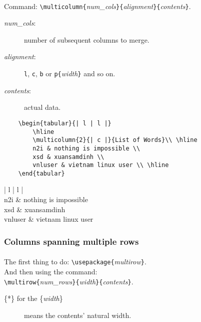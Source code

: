 \paragraph{}
Command: \verb|\multicolumn{|\emph{num\_cols}\verb|}{|\emph{alignment}\verb|}{|\emph{contents}\verb|}|.
\begin{description}
	\item[\emph{num\_cols}:] number of subsequent columns to merge.
	\item[\emph{alignment}:] \texttt{l}, \texttt{c}, \texttt{b} or \verb|p{|\emph{width}\verb|}| and so on.
	\item[\emph{contents}:] actual data.
\end{description}

\begin{verbatim}
	\begin{tabular}{| l | l |}
		\hline
		\multicolumn{2}{| c |}{List of Words}\\ \hline
		n2i & nothing is impossible \\
		xsd & xuansamdinh \\
		vnluser & vietnam linux user \\ \hline
	\end{tabular}
\end{verbatim}
\begin{table}[htbp]
	\centering
	\begin{tabular}{| l | l |}
		\hline
		 \\ \hline
		n2i & nothing is impossible \\
		xsd & xuansamdinh \\
		vnluser & vietnam linux user \\ \hline
	\end{tabular}
	\caption{Rows spanning multi cols}
	\label{rowsspan}
\end{table}
\subsubsection{Columns spanning multiple rows}

\paragraph{}
The first thing to do: \verb|\usepackage{|\emph{multirow}\verb|}|.\\
And then using the command:\\ \verb|\multirow{|\emph{num\_rows}\verb|}{|\emph{width}\verb|}{|\emph{contents}\verb|}|.
\begin{description}
	\item[\{*\} for the \{\emph{width}\}] means the contents' natural width.
\end{description}

